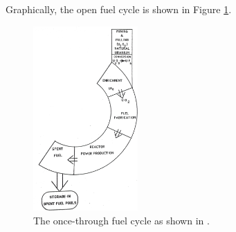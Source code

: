 Graphically, the open fuel cycle is shown in Figure \ref{fig:open-cycle}.

\begin{figure}[]
  \begin{center}
    \includegraphics[width=4cm]{./chapters/intro/open_cycle.png}
  \caption{The once-through fuel cycle as shown in \cite{cochran1990nuclear}.}
  \label{fig:open-cycle}
  \end{center}
\end{figure}
